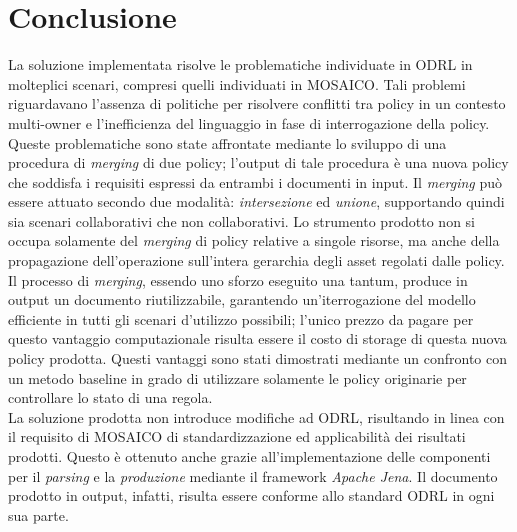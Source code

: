 \documentclass[12pt,a4paper,twoside]{book}
\begin{document}
\chapter{Conclusione}
La soluzione implementata risolve le problematiche individuate in ODRL in molteplici scenari, compresi quelli individuati in MOSAICO. Tali problemi riguardavano l'assenza di politiche per risolvere conflitti tra policy in un contesto multi-owner e l'inefficienza del linguaggio in fase di interrogazione della policy. Queste problematiche sono state affrontate mediante lo sviluppo di una procedura di \textit{merging} di due policy; l'output di tale procedura è una nuova policy che soddisfa i requisiti espressi da entrambi i documenti in input. Il \textit{merging} può essere attuato secondo due modalità: \textit{intersezione} ed \textit{unione}, supportando quindi sia scenari collaborativi che non collaborativi. Lo strumento prodotto non si occupa solamente del \textit{merging} di policy relative a singole risorse, ma anche della propagazione dell'operazione sull'intera gerarchia degli asset regolati dalle policy.\\
Il processo di \textit{merging}, essendo uno sforzo eseguito una tantum, produce in output un documento riutilizzabile, garantendo un'iterrogazione del modello efficiente in tutti gli scenari d'utilizzo possibili; l'unico prezzo da pagare per questo vantaggio computazionale risulta essere il costo di storage di questa nuova policy prodotta. Questi vantaggi sono stati dimostrati mediante un confronto con un metodo baseline in grado di utilizzare solamente le policy originarie per controllare lo stato di una regola.\\
La soluzione prodotta non introduce modifiche ad ODRL, risultando in linea con il requisito di MOSAICO di standardizzazione ed applicabilità dei risultati prodotti. Questo è ottenuto anche grazie all'implementazione delle componenti per il \textit{parsing} e la \textit{produzione} mediante il framework \textit{Apache Jena}. Il documento prodotto in output, infatti, risulta essere conforme allo standard ODRL in ogni sua parte. 
{}

\end{document}
